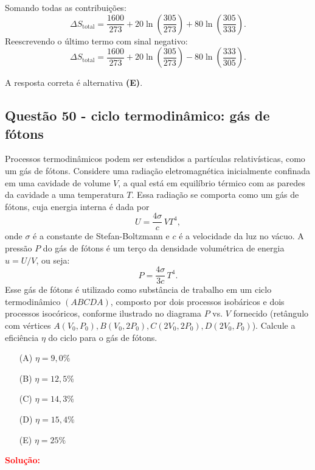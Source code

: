 \documentclass[a4paper,12pt]{article}
\begin{document}
\begin{flushleft}
Somando todas as contribuições:
\[
\Delta S_{\text{total}} = \frac{1600}{273} + 20\ln\!\left(\frac{305}{273}\right) + 80\ln\!\left(\frac{305}{333}\right).
\]
Reescrevendo o último termo com sinal negativo:
\[
\Delta S_{\text{total}} = \frac{1600}{273} + 20\ln\!\left(\frac{305}{273}\right) - 80\ln\!\left(\frac{333}{305}\right).
\]

A resposta correta é alternativa \colorbox{green!50}{\textbf{(E)}}.

\end{flushleft}


\begin{flushleft}
\subsection{Quest\~ao 50 - ciclo termodinâmico: gás de fótons}
Processos termodinâmicos podem ser estendidos a partículas relativísticas, como um gás de fótons. Considere uma radiação 
eletromagnética inicialmente confinada em uma cavidade de volume \(V\), a qual está em equilíbrio térmico com as paredes 
da cavidade a uma temperatura \(T\). Essa radiação se comporta como um gás de fótons, cuja energia interna é dada por
\[
U=\frac{4\sigma}{c}\,V T^4,
\]
onde \(\sigma\) é a constante de Stefan-Boltzmann e \(c\) é a velocidade da luz no vácuo. A pressão \(P\) do gás de fótons 
é um terço da densidade volumétrica de energia \(u=U/V\), ou seja:
\[
P=\frac{4\sigma}{3c}\,T^4.
\]
Esse gás de fótons é utilizado como substância de trabalho em um ciclo termodinâmico \((A\!B\!C\!D\!A)\), composto por dois 
processos isobáricos e dois processos isocóricos, conforme ilustrado no diagrama \(P\) vs. \(V\) fornecido (retângulo com 
vértices \(A(V_0,P_0), B(V_0,2P_0), C(2V_0,2P_0), D(2V_0,P_0)\)). Calcule a eficiência \(\eta\) do ciclo para o gás de fótons.

\begin{itemize}
\item[(A)] \(\eta = 9{,}0\%\)
\item[(B)] \(\eta = 12{,}5\%\)
\item[(C)] \(\eta = 14{,}3\%\)
\item[(D)] \(\eta = 15{,}4\%\)
\item[(E)] \(\eta = 25\%\)
\end{itemize}

\vspace{0.5cm}

\textcolor{red}{\textbf{Solução:}}\\


\end{flushleft}
\end{document}
